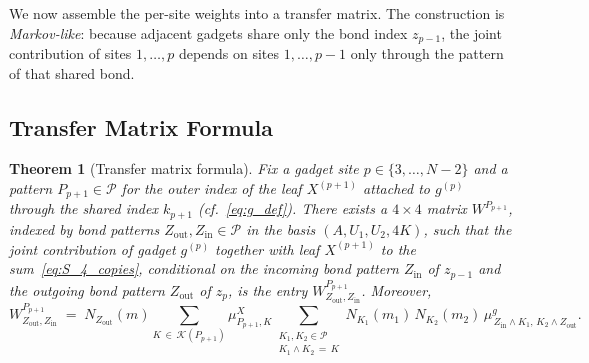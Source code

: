 \documentclass[12pt,a4paper]{article}
\newtheorem{theorem}{Theorem}[section]
\begin{document}
We now assemble the per-site weights into a transfer matrix. The 
construction is \emph{Markov-like}: because adjacent gadgets share only 
the bond index $z_{p-1}$, the joint contribution of sites 
$1, \dots, p$ depends on sites $1, \dots, p-1$ only through the pattern 
of that shared bond.
\subsection{Transfer Matrix Formula}
\begin{theorem}[Transfer matrix formula]\label{thm:W-bulk}
Fix a gadget site $p \in \{3, \dots, N-2\}$ and a pattern $P_{p+1} \in \mathcal{P}$ for the outer index of the leaf  $X^{(p+1)}$ attached to $g^{(p)}$ through the shared index $k_{p+1}$ 
(cf.~\eqref{eq:g_def}). 
There exists a $4 \times 4$ matrix $W^{P_{p+1}}$, indexed by bond patterns $Z_{\mathrm{out}}, Z_{\mathrm{in}} \in \mathcal{P}$ in the basis 
$(A, U_{1}, U_{2}, 4K)$, such that the joint contribution of gadget $g^{(p)}$ together with leaf $X^{(p+1)}$ to the sum~\eqref{eq:S_4_copies}, conditional on the incoming bond pattern $Z_{\mathrm{in}}$ of $z_{p-1}$ and the outgoing bond pattern $Z_{\mathrm{out}}$ of $z_{p}$, is the entry 
$W^{P_{p+1}}_{Z_{\mathrm{out}}, Z_{\mathrm{in}}}$. Moreover,
\begin{equation}\label{eq:W-bulk}
W^{P_{p+1}}_{Z_{\mathrm{out}}, Z_{\mathrm{in}}}
\;=\;
N_{Z_{\mathrm{out}}}(m)
\!\!\sum_{K \,\in\, \mathcal{K}(P_{p+1})}\!\! \mu^{X}_{P_{p+1}, K}
\!\!\!\!\sum_{\substack{K_{1}, K_{2} \in \mathcal{P} \\ K_{1} \wedge K_{2} \,=\, K}}\!\!\!\!
N_{K_{1}}(m_{1})\, N_{K_{2}}(m_{2})\,
\mu^{g}_{\,Z_{\mathrm{in}} \wedge K_{1},\, K_{2} \wedge Z_{\mathrm{out}}}.
\end{equation}
\end{theorem}
\end{document}
